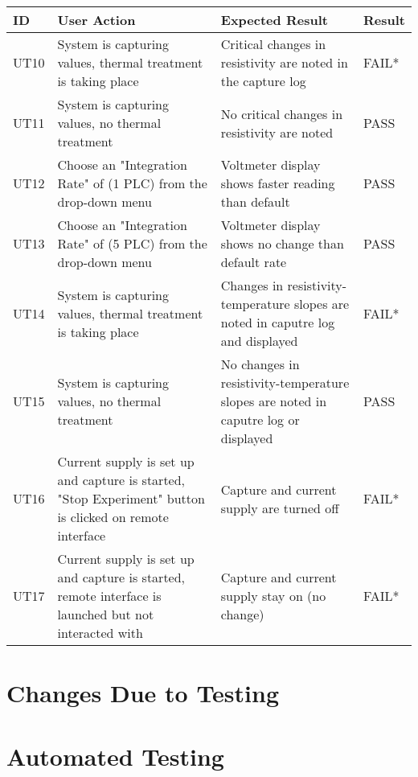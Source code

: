 \documentclass[12pt, titlepage]{article}
\begin{document}
\begin{table}[H]
	\centering
	\begin{tabular}{|p{1cm}|p{5cm}|p{5cm}|p{1.3cm}|}
		\hline
		\textbf{ID} & \textbf{User Action} & \textbf{Expected Result}  & \textbf{Result}\\ \hline
		UT10 & System is capturing values, thermal treatment is taking place & Critical changes in resistivity are noted in the capture log & FAIL*\\ \hline
		UT11 & System is capturing values, no thermal treatment & No critical changes in resistivity are noted & PASS\\ \hline
		UT12 & Choose an "Integration Rate" of (1 PLC) from the drop-down menu & Voltmeter display shows faster reading than default & PASS \\ \hline
		UT13 & Choose an "Integration Rate" of (5 PLC) from the drop-down menu & Voltmeter display shows no change than default rate & PASS\\ \hline
		UT14 & System is capturing values, thermal treatment is taking place & Changes in resistivity-temperature slopes are noted in caputre log and displayed & FAIL* \\ \hline
		UT15 & System is capturing values, no thermal treatment & No changes in resistivity-temperature slopes are noted in caputre log or displayed & PASS \\ \hline
		UT16 & Current supply is set up and capture is started, "Stop Experiment" button is clicked on remote interface & Capture and current supply are turned off & FAIL* \\ \hline
		UT17 & Current supply is set up and capture is started, remote interface is launched but not interacted with & Capture and current supply stay on (no change) & FAIL* \\ \hline
	\end{tabular}
\end{table}

\section{Changes Due to Testing}


\section{Automated Testing}
		
\end{document}
